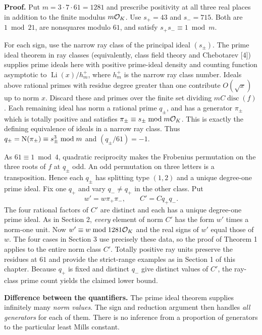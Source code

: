 \documentclass[11pt,a4paper,oneside,openany]{book}
\newcommand{\lead}[1]{\textbf{#1}\enspace}\let\para\lead
\begin{document}
\lead{Proof.} Put $m=3\cdot7\cdot61=1281$ and prescribe positivity at all three real places in addition to the finite modulus $m\mathcal O_K$. Use $s_+=43$ and $s_-=715$. Both are $1\bmod21$, are nonsquares modulo $61$, and satisfy $s_+s_-\equiv1\bmod m$.

For each sign, use the narrow ray class of the principal ideal $(s_\pm)$. The prime ideal theorem in ray classes (equivalently, class field theory and Chebotarev [4]) supplies prime ideals here with positive prime-ideal density and counting function asymptotic to $\operatorname{Li}(x)/h_m^+$, where $h_m^+$ is the narrow ray class number. Ideals above rational primes with residue degree greater than one contribute $O(\sqrt{x})$ up to norm $x$. Discard these and primes over the finite set dividing $mC\operatorname{disc}(f)$. Each remaining ideal has norm a rational prime $q_\pm$, and has a generator $\pi_\pm$ which is totally positive and satisfies $\pi_\pm\equiv s_\pm\bmod m\mathcal O_K$. This is exactly the defining equivalence of ideals in a narrow ray class. Thus $q_\pm=\operatorname{N}(\pi_\pm)\equiv s_\pm^3\bmod m$ and $(q_\pm/61)=-1$.

As $61\equiv1\bmod4$, quadratic reciprocity makes the Frobenius permutation on the three roots of $f$ at $q_\pm$ odd. An odd permutation on three letters is a transposition. Hence each $q_\pm$ has splitting type $(1,2)$ and a unique degree-one prime ideal. Fix one $q_+$ and vary $q_-\ne q_+$ in the other class. Put
\[
 w'=w\pi_+\pi_-,\qquad C'=Cq_+q_- .
\]
The four rational factors of $C'$ are distinct and each has a unique degree-one prime ideal. As in Section 2, \emph{every} element of norm $C'$ has the form $w'$ times a norm-one unit. Now $w'\equiv w\bmod1281\mathcal O_K$ and the real signs of $w'$ equal those of $w$. The four cases in Section 3 use precisely these data, so the proof of Theorem 1 applies to the entire norm class $C'$. Totally positive ray units preserve the residues at $61$ and provide the strict-range examples as in Section 1 of this chapter. Because $q_+$ is fixed and distinct $q_-$ give distinct values of $C'$, the ray-class prime count yields the claimed lower bound.

\lead{Difference between the quantifiers.} The prime ideal theorem supplies infinitely many \emph{norm values}. The sign and reduction argument then handles \emph{all generators} for each of them. There is no inference from a proportion of generators to the particular least Mills constant.
\end{document}
